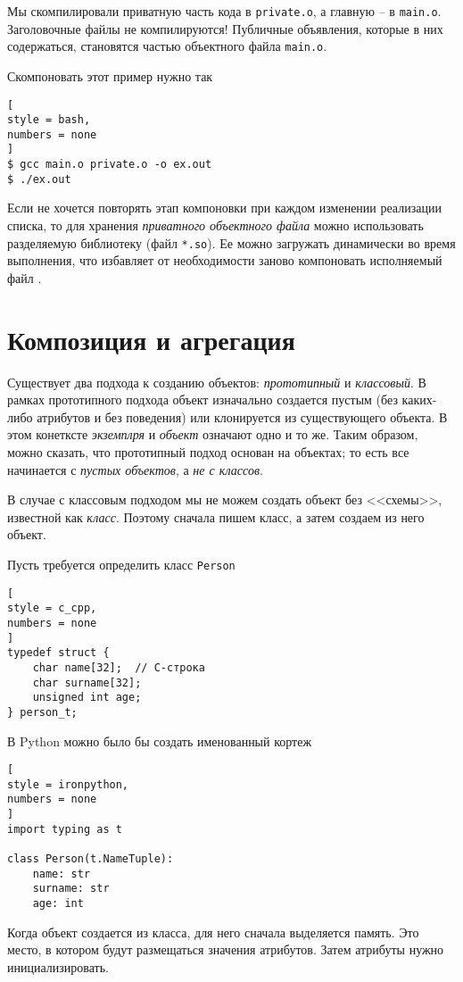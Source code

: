 \documentclass[%
	11pt,
	a4paper,
	utf8,
		]{article}
\begin{document}
Мы скомпилировали приватную часть кода в \verb|private.o|, а главную -- в \verb|main.o|. Заголовочные файлы не компилируются! Публичные объявления, которые в них содержаться, становятся частью объектного файла \verb|main.o|.

Скомпоновать этот пример нужно так
\begin{lstlisting}[
style = bash,
numbers = none
]
$ gcc main.o private.o -o ex.out
$ ./ex.out
\end{lstlisting}

Если не хочется повторять этап компоновки при каждом изменении реализации списка, то для хранения \emph{приватного объектного файла} можно использовать разделяемую библиотеку (файл \verb|*.so|). Ее можно загружать динамически во время выполнения, что избавляет от необходимости заново компоновать исполняемый файл \cite[]{amini-extreme-c:2022}.

\section{Композиция и агрегация}

Существует два подхода к созданию объектов: \emph{прототипный} и \emph{классовый}. В рамках прототипного подхода объект изначально создается пустым (без каких-либо атрибутов и без поведения) или клонируется из существующего объекта. В этом конетксте \emph{экземплря} и \emph{объект} означают одно и то же. Таким образом, можно сказать, что прототипный подход основан на объектах; то есть все начинается с \emph{пустых объектов}, а \emph{не с классов}.

В случае с классовым подходом мы не можем создать объект без <<схемы>>, известной как \emph{класс}. Поэтому сначала пишем класс, а затем создаем из него объект.

Пусть требуется определить класс \verb|Person| 
\begin{lstlisting}[
style = c_cpp,
numbers = none
]
typedef struct {
    char name[32];  // C-строка
    char surname[32]; 
    unsigned int age;
} person_t;
\end{lstlisting}

В Python можно было бы создать именованный кортеж
\begin{lstlisting}[
style = ironpython,
numbers = none
]
import typing as t

class Person(t.NameTuple):
    name: str
    surname: str
    age: int
\end{lstlisting}

Когда объект создается из класса, для него сначала выделяется память. Это место, в котором будут размещаться значения атрибутов. Затем атрибуты нужно инициализировать. 
\end{document}
